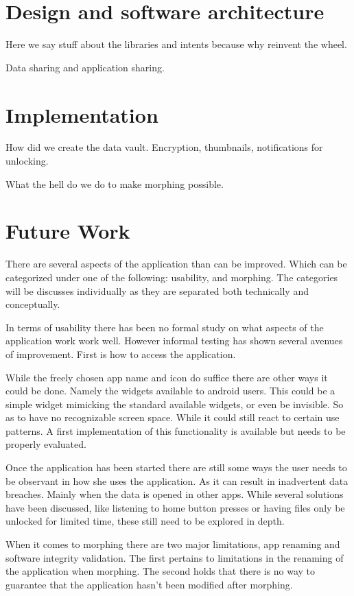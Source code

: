 \documentclass[twocolumn,english,compsoc,journal]{IEEEtran}
\begin{document}
\section{Design and software architecture}

Here we say stuff about the libraries and intents because why reinvent
the wheel.

Data sharing and application sharing.


\section{Implementation}

How did we create the data vault. Encryption, thumbnails, notifications
for unlocking.

What the hell do we do to make morphing possible.


\section{Future Work}

There are several aspects of the application than can be improved. Which
can be categorized under one of the following: usability, and morphing.
The categories will be discusses individually as they are separated both
technically and conceptually. 

In terms of usability there has been no formal study on what aspects of
the application work work well. However informal testing has shown several
avenues of improvement. First is how to access the application. 

While the freely chosen app name and icon do suffice there are other ways 
it could be done. Namely the widgets available to android users. This could 
be a simple widget mimicking the standard available widgets, or even be 
invisible. So as to have no recognizable screen space. While it could still
react to certain use patterns. A first implementation of this functionality is
available but needs to be properly evaluated.

Once the application has been started there are still some ways the user
needs to be observant in how she uses the application. As it can result in
inadvertent data breaches. Mainly when the data is opened in other apps.
While several solutions have been discussed, like listening to home button
presses or having files only be unlocked for limited time, these still need
to be explored in depth.

When it comes to morphing there are two major limitations, app renaming
and software integrity validation. The first pertains to limitations in the renaming
of the application when morphing. The second holds that there is no way
to guarantee that the application hasn't been modified after morphing.
\end{document}
